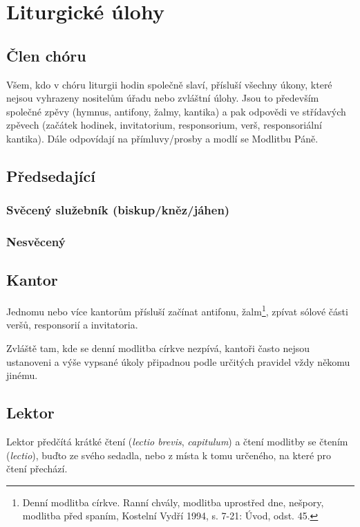 \section{Liturgické úlohy}

\subsection{Člen chóru}

Všem, kdo v chóru liturgii hodin společně slaví, přísluší všechny úkony,
které nejsou vyhrazeny nositelům úřadu nebo zvláštní úlohy.
Jsou to především společné zpěvy
(hymnus, antifony, žalmy, kantika)
a pak odpovědi ve střídavých zpěvech (začátek hodinek, invitatorium,
responsorium, verš, responsoriální kantika).
Dále odpovídají na přímluvy/prosby a modlí se Modlitbu Páně.

\subsection{Předsedající}
\subsubsection{Svěcený služebník (biskup/kněz/jáhen)}
\subsubsection{Nesvěcený}

\subsection{Kantor}

Jednomu nebo více kantorům přísluší
začínat antifonu, žalm\footnote{Denní modlitba církve. Ranní chvály, modlitba uprostřed dne, nešpory, modlitba před spaním, Kostelní Vydří 1994, s. 7-21: Úvod, odst. 45.},
zpívat sólové části veršů, responsorií a invitatoria.

Zvláště tam, kde se denní modlitba církve nezpívá, kantoři často
nejsou ustanoveni a výše vypsané úkoly připadnou podle určitých pravidel
vždy někomu jinému.

\subsection{Lektor}

Lektor předčítá krátké čtení (\emph{lectio brevis}, \emph{capitulum})
a čtení modlitby se čtením (\emph{lectio}), buďto ze svého sedadla,
nebo z místa k tomu určeného, na které pro čtení přechází.

